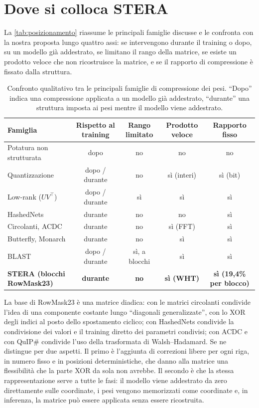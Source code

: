 \section{Dove si colloca STERA}

La \autoref{tab:posizionamento} riassume le principali famiglie discusse e le confronta con la nostra proposta lungo quattro assi: se intervengono durante il training o dopo, su un modello già addestrato, se limitano il rango della matrice, se esiste un prodotto veloce che non ricostruisce la matrice, e se il rapporto di compressione è fissato dalla struttura.

\begin{table}[ht]
\centering
\small
\begin{tabularx}{\linewidth}{Xcccc}
\toprule
Famiglia & Rispetto al training & Rango limitato & Prodotto veloce & Rapporto fisso \\
\midrule
Potatura non strutturata & dopo & no & no & no \\
Quantizzazione & dopo / durante & no & sì (interi) & sì (bit) \\
Low-rank ($UV^\top$) & dopo / durante & sì & sì & sì \\
HashedNets & durante & no & no & sì \\
Circolanti, ACDC & durante & no & sì (FFT) & sì \\
Butterfly, Monarch & durante & no & sì & sì \\
BLAST & dopo / durante & sì, a blocchi & sì & sì \\
\textbf{STERA (blocchi RowMask23)} & \textbf{durante} & \textbf{no} & \textbf{sì (WHT)} & \textbf{sì (19,4\% per blocco)} \\
\bottomrule
\end{tabularx}
\caption{Confronto qualitativo tra le principali famiglie di compressione dei pesi. ``Dopo'' indica una compressione applicata a un modello già addestrato, ``durante'' una struttura imposta ai pesi mentre il modello viene addestrato.}
\label{tab:posizionamento}
\end{table}

La base di RowMask23 è una matrice diadica: con le matrici circolanti condivide l'idea di una componente costante lungo ``diagonali generalizzate'', con lo XOR degli indici al posto dello spostamento ciclico; con HashedNets condivide la condivisione dei valori e il training diretto dei parametri condivisi; con ACDC e con QuIP\# condivide l'uso della trasformata di Walsh--Hadamard. Se ne distingue per due aspetti. Il primo è l'aggiunta di correzioni libere per ogni riga, in numero fisso e in posizioni deterministiche, che danno alla matrice una flessibilità che la parte XOR da sola non avrebbe. Il secondo è che la stessa rappresentazione serve a tutte le fasi: il modello viene addestrato da zero direttamente sulle coordinate, i pesi vengono memorizzati come coordinate e, in inferenza, la matrice può essere applicata senza essere ricostruita.

